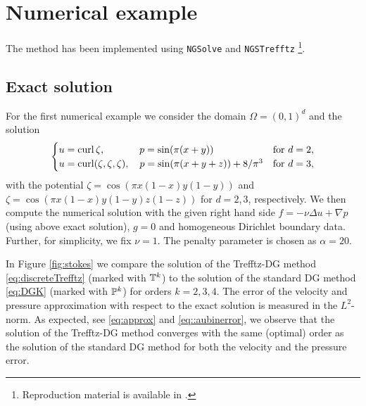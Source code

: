 \documentclass[pdflatex,sn-mathphys,Numbered]{sn-jnl}%
\theoremstyle{remark}%
\theoremstyle{definition}%
\begin{document}

\section{Numerical example}\label{sec:num}

The method has been implemented using \texttt{NGSolve} \cite{ngsolve} and \texttt{NGSTrefftz} \cite{ngstrefftz} \footnote{Reproduction material is available in \cite{UHPEQG_2023}.}.

\subsection{Exact solution}

For the first numerical example we consider the domain $\Omega =
(0,1)^d$ and the solution
\begin{align*}
\begin{cases}
  u=\operatorname{\mathrm{curl}} \zeta, \qquad\quad\,\,\,  p = \sin(\pi (x+y)) & \textrm{for } d = 2,\\
  u=\operatorname{\mathrm{curl}} (\zeta,\zeta,\zeta),\quad  p =  \sin(\pi (x+y+z)) + 8/\pi^3 & \textrm{for } d = 3,
\end{cases}
\end{align*}
with the potential %
    $\zeta = \cos(\pi x(1-x) y(1-y))$
and 
$\zeta = \cos(\pi x(1-x) y(1-y) z(1-z))$
for $d=2,3$, respectively. We then compute the numerical solution with
the given right hand side $f=-\nu \Delta u + \nabla p$ (using above
exact solution), $g=0$ and homogeneous Dirichlet boundary data.
Further, for simplicity, we fix $\nu=1$. The penalty parameter is
chosen as $\alpha = 20$.

In Figure \ref{fig:stokes} we compare the solution of the Trefftz-DG
method \eqref{eq:discreteTrefftz} (marked with $\mathbb{T}^k$) to the
solution of the standard DG method \eqref{eq:DGK} (marked with
$\mathbb{P}^k$) for orders $k=2,3,4$. The error of the velocity and pressure
approximation with respect to the exact solution is measured in the
$L^2$-norm. As expected, see \eqref{eq:approx} and
\eqref{eq::aubinerror}, we observe that the solution of the Trefftz-DG
method converges with the same (optimal) order as the solution of the
standard DG method for both the velocity and the pressure error.
\end{document}
